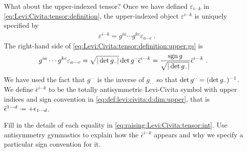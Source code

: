 \begin{subappendices}
What about the upper-indexed tensor? Once we have defined $\varepsilon_{i\cdots k}$ in \eqref{eq:Levi:Civita:tensor:definition}, the upper-indexed object $\varepsilon^{i\cdots k}$ is uniquely specified by
\begin{align}
    \varepsilon^{i\cdots k}
    =
    g^{ia}\cdots g^{kc}
    \varepsilon_{a\cdots c} \ .
    \label{eq:Levi:Civita:tensor:definition:upper:gs}
\end{align}
The right-hand side of \eqref{eq:Levi:Civita:tensor:definition:upper:gs} is
\begin{align}
    g^{ia}\cdots g^{kc}
    \varepsilon_{a\cdots c}
    &=
    \sqrt{|\det g_{\cdot\cdot}|}
    \det{g^{\cdot\cdot}}
    \bar{\epsilon}^{i\cdots k}
    =
    \frac{\operatorname{\textnormal{sgn}}{g}}{\sqrt{|\det{g_{\cdot\cdot}}|}}
    \bar{\epsilon}^{i\cdots k} 
    \ .
    \label{eq:raising:Levi:Civita:tensor:int}
\end{align}
We have used the fact that $g^{\cdot\cdot}$ is the inverse of $g_{\cdot\cdot}$ so that $\det{g^{\cdot\cdot}} = (\det g_{\cdot\cdot})^{-1}$. 
% 
We define $\bar\epsilon^{i\cdots k}$ to be the totally antisymmetric Levi-Civita symbol with upper indices and sign convention in \eqref{eq:def:levi:civita:d:dim:upper}, that is $\bar\epsilon^{1\cdots d} \defeq +\epsilon_{1\cdots d}$.
\begin{exercise}
Fill in the details of each equality in \eqref{eq:raising:Levi:Civita:tensor:int}. Use antisymmetry gymnastics to explain how the $\bar\epsilon^{i\cdots k}$ appears and why we specify a particular sign convention for it.

\end{exercise}
\end{subappendices}
